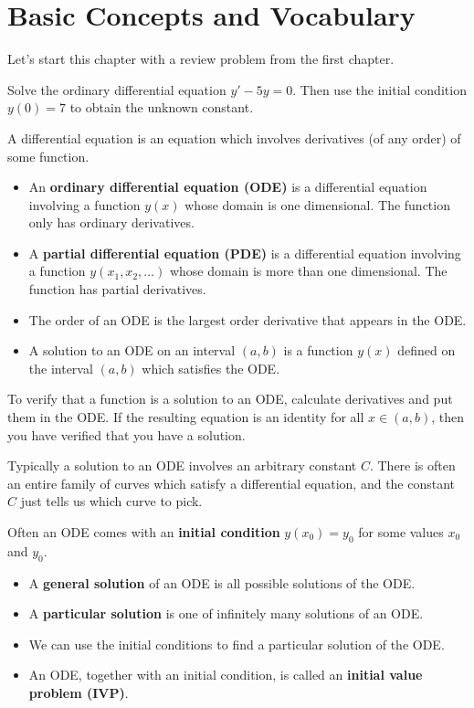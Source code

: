 \section{Basic Concepts and Vocabulary}
Let's start this chapter with a review problem from the first chapter. 


\begin{problem}
 Solve the ordinary differential equation $y'-5y=0$. Then use the initial condition $y(0) = 7$ to obtain the unknown constant.
\end{problem}

\begin{definition}
A differential equation is an equation which involves derivatives (of any order) of some function.  
\begin{itemize}
 \item An \textbf{ordinary differential equation (ODE)} is a differential equation involving a function $y(x)$ whose domain is one dimensional. The function only has ordinary derivatives.
 \item A \textbf{partial differential equation (PDE)} is a differential equation involving a function $y(x_1, x_2, \ldots)$ whose domain is more than one dimensional. The function has partial derivatives.  
 \item The order of an ODE is the largest order derivative that appears in the ODE. 
 \item A solution to an ODE on an interval $(a,b)$ is a function $y(x)$ defined on the interval $(a,b)$ which satisfies the ODE.  
\end{itemize}
\end{definition}

To verify that a function is a solution to an ODE, calculate derivatives and put them in the ODE. If the resulting equation is an identity for all $x\in (a,b)$, then you have verified that you have a solution. 

Typically a solution to an ODE involves an arbitrary constant $C$. There is often an entire family of curves which satisfy a differential equation, and the constant $C$ just tells us which curve to pick. 
\begin{definition}
Often an ODE comes with an \textbf{initial condition} $y(x_0)=y_0$ for some values $x_0$ and $y_0$. 
\begin{itemize}
 \item A \textbf{general solution} of an ODE is all possible solutions of the ODE.  
 \item A \textbf{particular solution} is one of infinitely many solutions of an ODE. 
 \item We can use the initial conditions to find a particular solution of the ODE. 
 \item An ODE, together with an initial condition, is called an \textbf{initial value problem (IVP)}. 
\end{itemize}
\end{definition}

